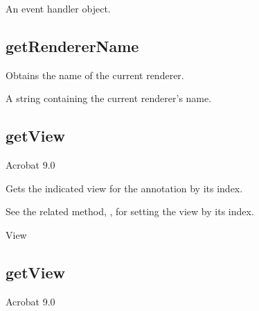 \documentclass[letterpaper,12pt,english,openany,oneside]{sphinxmanual}
\begin{document}
\label{\detokenize{JS_3D_API:section-92}}\label{\detokenize{JS_3D_API:returns-87}}

An event handler object.


\subsection{getRendererName}
\label{\detokenize{JS_3D_API:getrenderername}}
Obtains the name of the current renderer.

\label{\detokenize{JS_3D_API:syntax-87}}

\begin{sphinxVerbatim}[commandchars=\\\{\}]
\end{sphinxVerbatim}
\label{\detokenize{JS_3D_API:returns-88}}

A string containing the current renderer’s name.


\subsection{getView}
\label{\detokenize{JS_3D_API:getview}}
Acrobat 9.0

Gets the indicated view for the annotation by its index.

See the related method, , for setting the view by its index.

\label{\detokenize{JS_3D_API:syntax-88}}

\begin{sphinxVerbatim}[commandchars=\\\{\}]
  
\end{sphinxVerbatim}
\label{\detokenize{JS_3D_API:parameters-65}}

\label{\detokenize{JS_3D_API:section-93}}\label{\detokenize{JS_3D_API:returns-89}}

View


\subsection{getView}
\label{\detokenize{JS_3D_API:getview-1}}\label{\detokenize{JS_3D_API:id27}}
Acrobat 9.0
\end{document}
